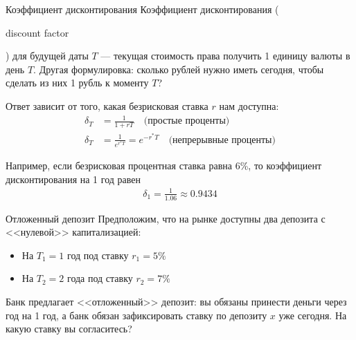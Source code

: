 \documentclass{beamer}
\newcommand{\en}[1]{\begin{otherlanguage}{english}#1\end{otherlanguage}}
\begin{document}
\begin{frame}{Коэффициент дисконтирования}
\justify
\alert{Коэффициент дисконтирования} (\en{discount factor}) для будущей даты $T$ --- текущая стоимость права получить 1 единицу валюты в день $T$. Другая формулировка: сколько рублей нужно иметь сегодня, чтобы сделать из них 1 рубль к моменту $T$?

\justify
Ответ зависит от того, какая безрисковая ставка $r$ нам доступна:
\begin{align*}
\delta_T &= \frac{1}{1 + rT} \quad \text{(простые проценты)} \\
\delta_T &= \frac{1}{e^{r^*T}} = e^{-r^*T} \quad \text{(непрерывные проценты)}
\end{align*}

\justify
Например, если безрисковая процентная ставка равна 6\%, то коэффициент дисконтирования на 1 год равен
\begin{align*}
\delta_1 = \frac{1}{1.06} \approx 0.9434
\end{align*}
\end{frame}



\begin{frame}{Отложенный депозит}
\justify
Предположим, что на рынке доступны два депозита с <<нулевой>> капитализацией:
\begin{itemize}
\item На $T_1=1$ год под ставку $r_1=5\%$ 
\item На $T_2=2$ года под ставку $r_2=7\%$ 
\end{itemize}

Банк предлагает <<отложенный>> депозит: вы обязаны принести деньги через год на 1 год, а банк обязан зафиксировать ставку по депозиту $x$ уже сегодня. На какую ставку вы согласитесь?

\centering
{}
\end{frame}
\end{document}
